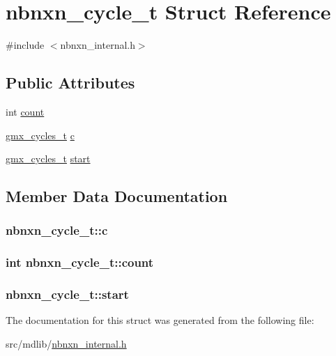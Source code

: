 \hypertarget{structnbnxn__cycle__t}{\section{nbnxn\-\_\-cycle\-\_\-t \-Struct \-Reference}
\label{structnbnxn__cycle__t}
}


{\ttfamily \#include $<$nbnxn\-\_\-internal.\-h$>$}

\subsection*{\-Public \-Attributes}
\begin{DoxyCompactItemize}
\item 
int \hyperlink{structnbnxn__cycle__t_a20eb0521e19641a2d83c3ed1f23ce31e}{count}
\item 
\hyperlink{include_2gmx__cyclecounter_8h_a7b04e633389542df9f5535b05b873baa}{gmx\-\_\-cycles\-\_\-t} \hyperlink{structnbnxn__cycle__t_a65913ea4351826b700b5960aef166903}{c}
\item 
\hyperlink{include_2gmx__cyclecounter_8h_a7b04e633389542df9f5535b05b873baa}{gmx\-\_\-cycles\-\_\-t} \hyperlink{structnbnxn__cycle__t_a03aebb655a93e0a264f5da86df50178b}{start}
\end{DoxyCompactItemize}


\subsection{\-Member \-Data \-Documentation}
\hypertarget{structnbnxn__cycle__t_a65913ea4351826b700b5960aef166903}{
\subsubsection[{c}]{ {\bf nbnxn\-\_\-cycle\-\_\-t\-::c}}}\label{structnbnxn__cycle__t_a65913ea4351826b700b5960aef166903}
\hypertarget{structnbnxn__cycle__t_a20eb0521e19641a2d83c3ed1f23ce31e}{
\subsubsection[{count}]{\setlength{\rightskip}{0pt plus 5cm}int {\bf nbnxn\-\_\-cycle\-\_\-t\-::count}}}\label{structnbnxn__cycle__t_a20eb0521e19641a2d83c3ed1f23ce31e}
\hypertarget{structnbnxn__cycle__t_a03aebb655a93e0a264f5da86df50178b}{
\subsubsection[{start}]{ {\bf nbnxn\-\_\-cycle\-\_\-t\-::start}}}\label{structnbnxn__cycle__t_a03aebb655a93e0a264f5da86df50178b}


\-The documentation for this struct was generated from the following file\-:\begin{DoxyCompactItemize}
\item 
src/mdlib/\hyperlink{nbnxn__internal_8h}{nbnxn\-\_\-internal.\-h}\end{DoxyCompactItemize}
